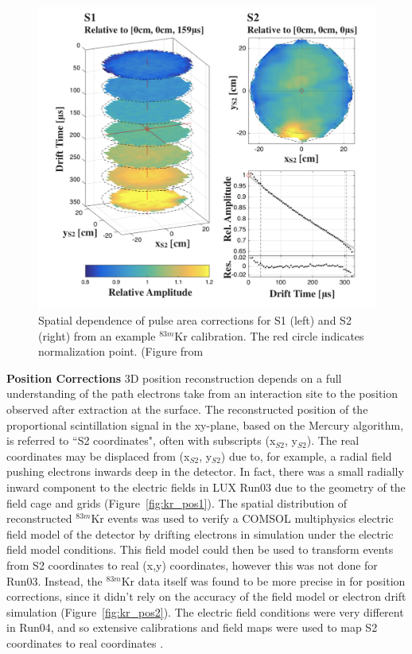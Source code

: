 \begin{figure}[htbp]
\begin{center}
\includegraphics[width=\textwidth]{figures/lux/kr_1.png}
\caption{ Spatial dependence of pulse area corrections for S1 (left) and S2 (right) from an example $^{83m}$Kr calibration. The red circle indicates normalization point. (Figure from \cite{LUXKr}}
\label{fig:kr_1}
\end{center}
\end{figure}

\textbf{Position Corrections} 3D position reconstruction depends on a full understanding of the path electrons take from an interaction site to the position observed after extraction at the surface. The reconstructed position of the proportional scintillation signal in the xy-plane, based on the Mercury algorithm, is referred to ``S2 coordinates", often with subscripts (x$_{S2}$, y$_{S2}$). The real coordinates may be displaced from (x$_{S2}$, y$_{S2}$) due to, for example, a radial field pushing electrons inwards deep in the detector. In fact, there was a small radially inward component to the electric fields in \ac{LUX} Run03 due to the geometry of the field cage and grids (Figure~\ref{fig:kr_pos1}). The spatial distribution of reconstructed $^{83m}$Kr events was used to verify a COMSOL multiphysics electric field model of the detector by drifting electrons in simulation under the electric field model conditions. This field model could then be used to transform events from S2 coordinates to real (x,y) coordinates, however this was not done for Run03. Instead, the $^{83m}$Kr data itself was found to be more precise in for position corrections, since it didn't rely on the accuracy of the field model or electron drift simulation (Figure~\ref{fig:kr_pos2}). The electric field conditions were very different in Run04, and so extensive calibrations and field maps were used to map S2 coordinates to real coordinates \cite{LUXFields}.

